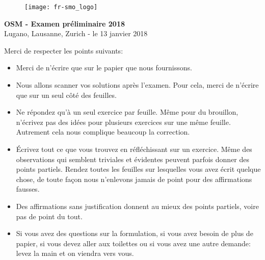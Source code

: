\documentclass[12pt,a4paper]{article}
\begin{document}
\thispagestyle{empty}
\begin{figure}[h]
\texttt{[image: fr-smo\_logo]}
\end{figure}

\vspace{1cm}

\begin{center}
\Huge{\textbf{OSM - Examen préliminaire 2018}}\\[1.5cm]
\large{Lugano, Lausanne, Zurich - le 13 janvier 2018}\\[2.5cm]
\end{center}


Merci de respecter les points suivants:

\begin{itemize}
\item Merci de n'écrire que sur le papier que nous fournissons.

\item Nous allons scanner vos solutions après l'examen. Pour cela, merci de n'écrire que sur un seul côté des feuilles.

\item Ne répondez qu'à un seul exercice par feuille. Même pour du brouillon, n'écrivez pas des idées pour plusieurs exercices sur une même feuille. Autrement cela nous complique beaucoup la correction.

\item Écrivez tout ce que vous trouvez en réfléchissant sur un exercice. Même des observations qui semblent triviales et évidentes peuvent parfois donner des points partiels. Rendez toutes les feuilles sur lesquelles vous avez écrit quelque chose, de toute façon nous n'enlevons jamais de point pour des affirmations fausses.

\item Des affirmations sans justification donnent au mieux des points partiels, voire pas de point du tout.


\item Si vous avez des questions sur la formulation, si vous avez besoin de plus de papier, si vous devez aller aux toilettes ou si vous avez une autre demande: levez la main et on viendra vers vous.


\end{itemize}
\end{document}
